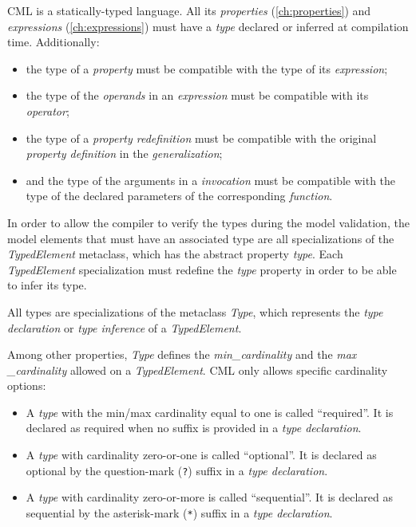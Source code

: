 CML is a statically-typed language.
All its \emph{properties} (\ref{ch:properties})
and \emph{expressions} (\ref{ch:expressions})
must have a \emph{type} declared or inferred at compilation time.
Additionally:

\begin{itemize}
\item the type of a \emph{property}
must be compatible with the type of its \emph{expression};
\item the type of the \emph{operands} in an \emph{expression}
must be compatible with its \emph{operator};
\item the type of a \emph{property redefinition} must be compatible with
the original \emph{property definition} in the \emph{generalization};
\item and the type of the arguments in a \emph{invocation}
must be compatible with the type of the declared parameters
of the corresponding \emph{function}.
\end{itemize}

In order to allow the compiler to verify the types during the model validation,
the model elements that must have an associated type
are all specializations of the \emph{TypedElement} metaclass,
which has the abstract property \emph{type}.
Each \emph{TypedElement} specialization must
redefine the \emph{type} property in order to be able to infer its type.

All types are specializations of the metaclass \emph{Type},
which represents the \emph{type declaration} or \emph{type inference}
of a \emph{TypedElement}.

Among other properties,
\emph{Type} defines the \emph{min\_cardinality} and the \emph{max \_cardinality}
allowed on a \emph{TypedElement}.
CML only allows specific cardinality options:

\begin{itemize}
  \item A \emph{type} with the min/max cardinality equal to one
  is called ``required''.
  It is declared as required when no suffix is provided in a \emph{type declaration}.
  \item A \emph{type} with cardinality zero-or-one is called ``optional''.
  It is declared as optional by the question-mark (\verb|?|) suffix
  in a \emph{type declaration}.
  \item A \emph{type} with cardinality zero-or-more
  is called ``sequential''.
  It is declared as sequential by the asterisk-mark (\verb|*|) suffix
  in a \emph{type declaration}.
\end{itemize}


